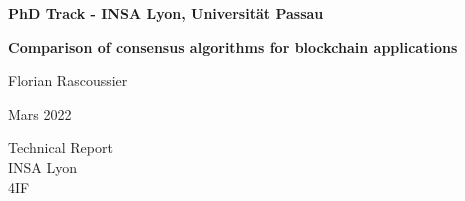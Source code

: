 \begin{titlepage}
    \begin{center}
        \vspace*{1cm}
        \Large
        \textbf{PhD Track - INSA Lyon, Universität Passau}
        
        \vspace{2cm}
        
        \Huge
        \textbf{Comparison of consensus algorithms for blockchain applications}
            
        \vspace{2cm}
        \Huge
        Florian Rascoussier
        
        \vspace{1.5cm}
        \LARGE
        Mars 2022
        
        \vfill
        
        \LARGE
        Technical Report\\
        INSA Lyon\\
        4IF\\
            
    \end{center}
\end{titlepage}